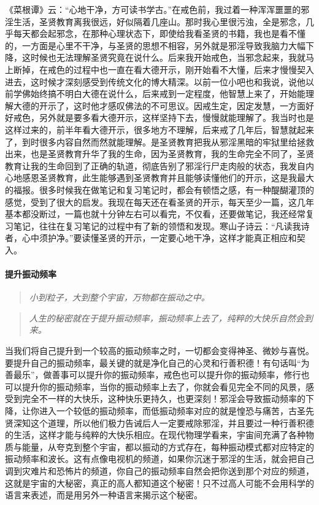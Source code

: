 《菜根谭》云：“心地干净，方可读书学古。”在戒色前，我过着一种浑浑噩噩的邪淫生活，圣贤教育离我很远，好似隔着几座山。那时我心里很污浊，全是邪念，几乎每天都会起邪念，在那种心理状态下，即使给我看圣贤的书籍，我也是看不懂的，一方面是心里不干净，与圣贤的思想不相容，另外就是邪淫导致我脑力大幅下降，这时候也无法理解圣贤究竟在说什么。后来我开始戒色，当邪念起来，我就马上断掉，在戒色的过程中也一直在看大德开示，刚开始看不大懂，后来才慢慢契入进去，这时候才深刻感受到传统文化的博大精深。以前一位小吧也和我说，说他以前学佛始终搞不明白大德在说什么，后来戒到一定程度，他智慧上来了，开始能理解大德的开示了，这时他才感叹佛法的不可思议。因戒生定，因定发慧，一方面好好戒色，另外就是要多看大德开示，这样坚持下去，慢慢就能理解了。我当时也是这样过来的，前半年看大德开示，很多地方不理解，后来戒了几年后，智慧就起来了，到时很多内容自然而然就能理解。是圣贤教育把我从邪淫黑暗的牢狱里给拯救出来，也是圣贤教育升华了我的生命，因为圣贤教育，我的生命完全不同了，圣贤教育让我的生命回到了正确的轨道，彻底告别了邪淫行尸走肉般的状态，我发自内心地感恩圣贤教育，此生能够遇到圣贤教育并且能够读懂他们的开示，这是我最大的福报。很多时候我在做笔记和复习笔记时，都会有顿悟之感，有一种醍醐灌顶的感觉，受到了很大的启发。我现在每天还在看圣贤的开示，每天至少一篇，这几年基本都没断过，一篇也就十分钟左右可以看完，不仅看，还要做笔记，我还经常复习笔记，往往在复习笔记的过程中有了新的领悟和发现。寒山子诗云：“凡读我诗者，心中须护净。”要读懂圣贤的开示，一定要心地干净，这样才能真正相应和契入。

\paragraph{提升振动频率}

\begin{quote}\it
    小到粒子，大到整个宇宙，万物都在振动之中。
\end{quote}

\begin{quote}\it
    人生的秘密就在于提升振动频率，振动频率上去了，纯粹的大快乐自然会到来。
\end{quote}

当我们将自己提升到一个较高的振动频率之时，一切都会变得神圣、微妙与喜悦。要提升自己的振动频率，最关键的就是净化自己的心灵和行善积德！有句话叫“为善最乐”，做善事可以提升你的振动频率，戒色也可以提升你的振动频率，修行也可以提升你的振动频率，当你的振动频率上去了，你就会看见完全不同的风景，感受到完全不一样的大快乐，这种快乐更持久，也更深刻！邪淫会导致振动频率的下降，让你进入一个较低的振动频率，而低振动频率对应的就是惶恐与痛苦，古圣先贤深知这个道理，所以他们极力告诫后人一定要戒除邪淫，并且要过一种行善积德的生活，这样才能与纯粹的大快乐相应。在现代物理学看来，宇宙间充满了各种物质与能量，从夸克到整个宇宙，都以振动的方式存在，每种振动模式都对应特定的振动频率和波长。这有点像电视机的频道，如果你沉迷于邪淫的生活，就会把自己调到灾难片和恐怖片的频道，你自己的振动频率自然会把你送到那个对应的频道，这就是宇宙的大秘密，真正的高人都知道这个秘密！只不过高人可能不会用科学的语言来表述，而是用另外一种语言来揭示这个秘密。

